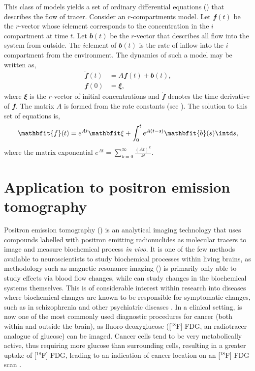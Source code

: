 This class of models yields a set of ordinary differential equations (\ode)
that describes the flow of tracer. Consider an $r$-compartments model. Let
$\mathbfit{f}(t)$ be the $r$-vector whose $i$\xth element corresponds to the
concentration in the $i$\xth compartment at time $t$. Let $\mathbfit{b}(t)$
be the $r$-vector that describes all flow into the system from outside. The
$i$\xth element of $\mathbfit{b}(t)$ is the rate of inflow into the $i$\xth
compartment from the environment. The dynamics of such a model may be written
as,
\begin{align*}
  \dot{\mathbfit{f}}(t) &= A\mathbfit{f}(t) + \mathbfit{b}(t), \\
  \mathbfit{f}(0) &= \mathbfit\xi,
\end{align*}
where $\mathbfit\xi$ is the $r$-vector of initial concentrations and
$\dot{\mathbfit{f}}$ denotes the time derivative of $\mathbfit{f}$. The
matrix $A$ is formed from the rate constants (see \cite{Gunn:2001cx}). The
solution \cite[][sec.~8.3.1]{Seber:2003vx} to this set of equations is,
\begin{equation*}
  \mathbfit{f}(t) = e^{A t}\mathbfit\xi +
  \int_0^t e^{A(t-s)}\mathbfit{b}(s)\intd s,
\end{equation*}
where the matrix exponential $e^{A t} = \sum_{k=0}^{\infty}
\frac{(At)^k}{k!}$.

\section{Application to positron emission tomography}
\label{sec:Application to positron emission tomography}

Positron emission tomography (\pet) is an analytical imaging technology that
uses compounds labelled with positron emitting radionuclides as molecular
tracers to image and measure biochemical process \emph{in vivo}. It is one of
the few methods available to neuroscientists to study biochemical processes
within living brains, as methodology such as magnetic resonance imaging
(\mri) is primarily only able to study effects via blood flow changes, while
\pet can study changes in the biochemical systems themselves. This is of
considerable interest within research into diseases where biochemical changes
are known to be responsible for symptomatic changes, such as in schizophrenia
and other psychiatric diseases \cite{FrankleL2002}. In a clinical setting,
\pet is now one of the most commonly used diagnostic procedures for cancer
(both within and outside the brain), as fluoro-deoxyglucose ([$^{18}$F]-FDG,
an radiotracer analogue of glucose) can be imaged. Cancer cells tend to be
very metabolically active, thus requiring more glucose than surrounding
cells, resulting in a greater uptake of [$^{18}$F]-FDG, leading to an
indication of cancer location on an [$^{18}$F]-FDG scan \cite{Gambhir2002}.

